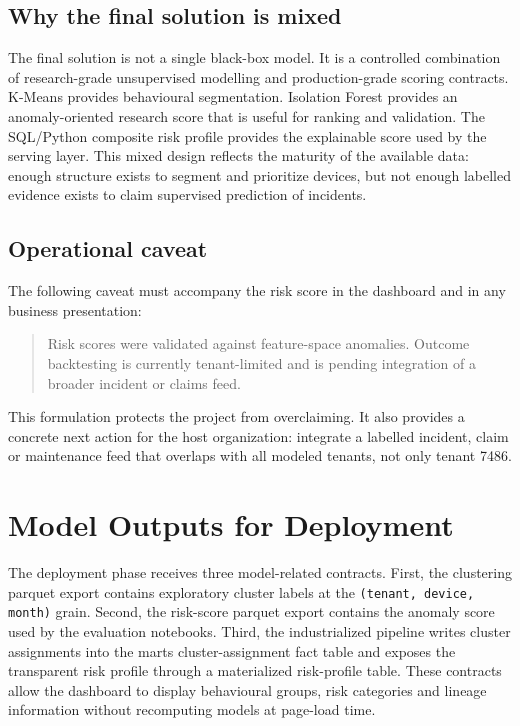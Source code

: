 \subsection{Why the final solution is mixed}
The final solution is not a single black-box model. It is a controlled combination of research-grade unsupervised modelling and production-grade scoring contracts. K-Means provides behavioural segmentation. Isolation Forest provides an anomaly-oriented research score that is useful for ranking and validation. The SQL/Python composite risk profile provides the explainable score used by the serving layer. This mixed design reflects the maturity of the available data: enough structure exists to segment and prioritize devices, but not enough labelled evidence exists to claim supervised prediction of incidents.

\subsection{Operational caveat}
The following caveat must accompany the risk score in the dashboard and in any business presentation:

\begin{quote}
Risk scores were validated against feature-space anomalies. Outcome backtesting is currently tenant-limited and is pending integration of a broader incident or claims feed.
\end{quote}

This formulation protects the project from overclaiming. It also provides a concrete next action for the host organization: integrate a labelled incident, claim or maintenance feed that overlaps with all modeled tenants, not only tenant 7486.

\section{Model Outputs for Deployment}
The deployment phase receives three model-related contracts. First, the clustering parquet export contains exploratory cluster labels at the \texttt{(tenant, device, month)} grain. Second, the risk-score parquet export contains the anomaly score used by the evaluation notebooks. Third, the industrialized pipeline writes cluster assignments into the marts cluster-assignment fact table and exposes the transparent risk profile through a materialized risk-profile table. These contracts allow the dashboard to display behavioural groups, risk categories and lineage information without recomputing models at page-load time.

